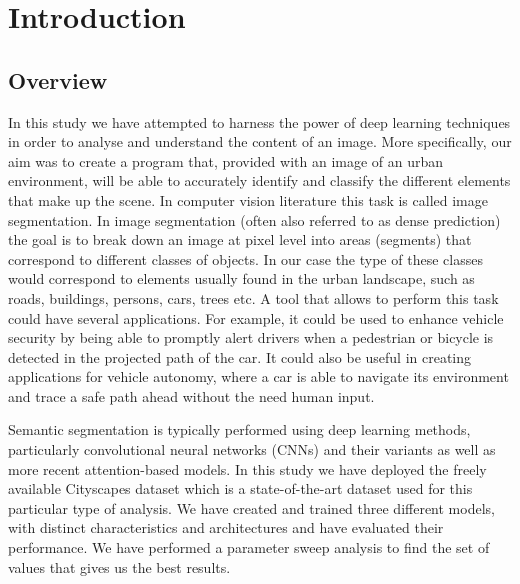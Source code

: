\section{Introduction}
\subsection{Overview}

In this study we have attempted to harness the power of deep learning techniques in order to analyse and understand the content of an image. More specifically, our aim was to create a program that, provided with an image of an urban environment, will be able to accurately identify and classify the different elements that make up the scene. In computer vision literature this task is called image segmentation. In image segmentation (often also referred to as dense prediction) the goal is to break down an image at pixel level into areas (segments) that correspond to different classes of objects. In our case the type of these classes would correspond to elements usually found in the urban landscape, such as roads, buildings, persons, cars, trees etc. A tool that allows to perform this task could have several applications. For example, it could be used to enhance vehicle security by being able to promptly alert drivers when a pedestrian or bicycle is detected in the projected path of the car. It could also be useful in creating applications for vehicle autonomy, where a car is able to navigate its environment and trace a safe path ahead without the need human input. 

Semantic segmentation is typically performed using deep learning methods, particularly convolutional neural networks (CNNs) and their variants as well as more recent attention-based models. In this study we have deployed the freely available Cityscapes dataset \cite{DBLP:journals/corr/CordtsORREBFRS16} which is a state-of-the-art dataset used for this particular type of analysis. We have created and trained three different models, with distinct characteristics and architectures and have evaluated their performance. We have performed a parameter sweep analysis to find the set of values that gives us the best results. 

